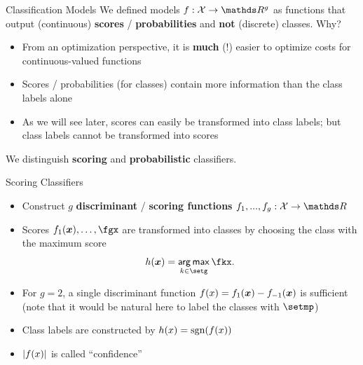 \begin{vbframe}{Classification Models} 
We defined models $f: \Xspace \to \R^g$ as functions that output (continuous) \textbf{scores} / \textbf{probabilities} and \textbf{not} (discrete) classes. Why? 

\begin{itemize}
  \item From an optimization perspective, it is \textbf{much} (!) easier to optimize costs for continuous-valued functions 
  \item Scores / probabilities (for classes) contain more information than the class labels alone
  \item As we will see later, scores can easily be transformed into class labels; but class labels cannot be transformed into scores
\end{itemize}

We distinguish \textbf{scoring} and \textbf{probabilistic} classifiers.
\end{vbframe}


\begin{vbframe}{Scoring Classifiers}
\begin{itemize}
\item Construct $g$ \textbf{discriminant} / \textbf{scoring functions} $f_1, ..., f_g: \Xspace \to \R$
\item Scores $f_1(\xv), \ldots, \fgx$ are transformed into classes by choosing the class with the maximum score 
$$
h(\xv) = \argmax_{k \in \setg} \fkx. 
$$ 

\item For $g = 2$, a single discriminant function $f(x) = f_{1}(\bm{x}) - f_{-1}(\bm{x})$ is sufficient (note that it would be natural here to label the classes with $\setmp$)  


\item Class labels are constructed by $h(x) = \text{sgn}(f(x))$
\item $|f(x)|$ is called \enquote{confidence}
\end{itemize}
\end{vbframe}

